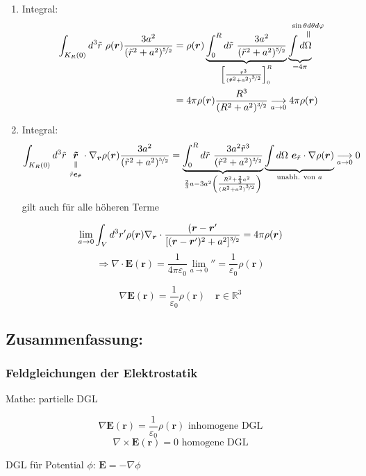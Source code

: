 \documentclass[titlepage,11pt,a4paper,ngerman]{report}
\newcommand{\verteq}{\rotatebox{90}{$\,=$}}
\newcommand{\equalto}[2]{\underset{\scriptstyle\overset{\mkern4mu\verteq}{#2}}{#1}}
\newcommand{\equaltoup}[2]{\overset{\scriptstyle\underset{\mkern4mu\verteq}{#2}}{#1}}
\newcommand{\kq}{\frac{1}{4\pi\epsilon_0}}
\newcommand{\intt}[2]{\int_{#1}^{#2}}
\renewcommand{\vec}[1]{\boldsymbol{#1}}
\renewcommand{\epsilon}{\varepsilon}
\renewcommand{\paragraph}[1]{\subsubsection{#1}}
\newcommand{\rbox}[1]{\begin{tcolorbox}[colback=white,colframe=red!75!black]#1\end{tcolorbox}}
\begin{document}
\begin{enumerate}
	\item Integral:
	\begin{align*}
	\int_{K_R (0)} d^3 \tilde r\ \rho(\vec{r}) \frac{3a^2}{(\tilde{r}^2 + a^2)^{\nicefrac{5}{2}}} &= \rho(\vec{r}) \underbrace{\intt{0}{R} d\tilde r\ \frac{3a^2}{(\tilde{r}^2 + a^2)^{\nicefrac{5}{2}}}}_{\left[\frac{\tilde r^3}{(\vec{\tilde{r}}^2 + a^2)^{\nicefrac{3}{2}}}\right]_0^R} \underbrace{\int d \equaltoup{\Omega}{\mathclap{\sin \theta d \theta d \varphi}}}_{= 4\pi}\\
	&= 4 \pi \rho(\vec{r}) \frac{R^3}{(R^2 + a^2)^{\nicefrac{3}{2}}} \underset{a \to 0}{\longrightarrow} 4 \pi \rho(\vec{r})
	\end{align*} 
	\item Integral:
	$$\int_{K_R (0)} d^3 \tilde{r}\ \equalto{\vec{\tilde{r}}}{\tilde{r}\vec{e}_{\vec{\tilde{r}}}} \cdot \nabla_{\vec{r}} \rho(\vec{r}) \frac{3 a^2}{(\tilde{r}^2 + a^2)^{\nicefrac{5}{2}}} = \underbrace{\intt{0}{R} d \tilde r\ \frac{3a^2 \tilde r^3}{(\tilde r^2 + a^2)^{\nicefrac{3}{2}}}}_{\frac{2}{3}a -3a^2 \left(\frac{R^2 +\frac{2}{3}a^2}{(R^2 + a^2)^{\nicefrac{3}{2}}}\right)} \underbrace{\int d \Omega\ \vec{e}_{\tilde{r}} \cdot \nabla \rho(\vec{r})}_{\textrm{unabh. von } a} \underset{a \to 0}{\longrightarrow} 0$$
	gilt auch für alle höheren Terme
\end{enumerate}

$$\lim_{a \to 0} \int_V d^3 r' \rho(\vec{r}) \nabla_{\vec{r}}\cdot \frac{(\vec{r}-\vec{r}'}{[(\vec{r}-\vec{r}')^2 + a^2]^{\nicefrac{3}{2}}} = 4 \pi \rho (\vec{r})$$
$$\Rightarrow \nabla \cdot \vec{E}(\vec{r}) = \kq \lim_{a \to 0} '' = \frac{1}{\epsilon_0} \rho(\vec{r})$$

\rbox{$$\nabla \vec{E}(\vec{r}) = \frac{1}{\epsilon_0} \rho(\vec{r}) \quad \vec{r} \in \mathbb R^3$$}

\subsection{Zusammenfassung:}

\paragraph{Feldgleichungen der Elektrostatik}
Mathe: partielle DGL
\rbox{$$\nabla \vec{E}(\vec{r}) = \frac{1}{\epsilon_0} \rho(\vec{r}) \textrm{ inhomogene DGL}$$ 
	$$\nabla \times \vec{E}(\vec{r}) = 0\textrm{ homogene DGL}$$}
DGL für Potential $\phi$: 
$\vec{E} = - \nabla \phi$
\end{document}
